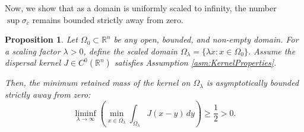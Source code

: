 \documentclass[11pt, a4paper]{article}
\theoremstyle{break}
\theoremstyle{break}
\newtheorem{prp}{Proposition}[section]
\theoremstyle{break}
\theoremstyle{break}
\theoremstyle{break}
\theoremstyle{break}
\theoremstyle{break}
\theoremstyle{break}
\theoremstyle{break}
\begin{document}
Now, we show that as a domain is uniformly scaled to infinity, the number $\sup \sigma_c$ remains bounded strictly away from zero.

\begin{prp}
    \label{prp:retained_mass_limit}
    Let $\Omega_0 \subset \mathbb{R}^n$ be any open, bounded, and non-empty domain. For a scaling factor $\lambda > 0$, define the scaled domain $\Omega_\lambda = \{ \lambda x : x \in \Omega_0 \}$. Assume the dispersal kernel $J \in C^0(\mathbb{R}^n)$ satisfies Assumption \ref{asm:KernelProperties}.
    
    Then, the minimum retained mass of the kernel on $\Omega_\lambda$ is asymptotically bounded strictly away from zero:
    \begin{equation}
        \liminf_{\lambda \to \infty} \left( \min_{x \in \overline{\Omega_\lambda}} \int_{\Omega_\lambda} J(x-y) \, dy \right) \geq \frac{1}{2} > 0.
    \end{equation}
\end{prp}
\end{document}
